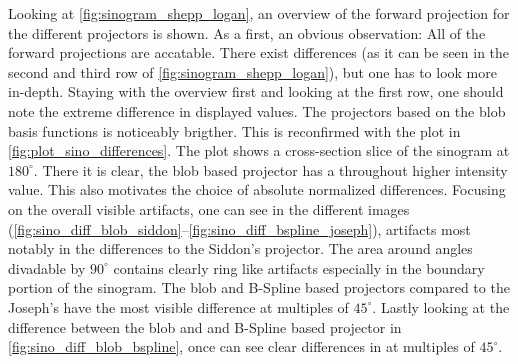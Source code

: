 Looking at \autoref{fig:sinogram_shepp_logan}, an overview of the forward projection for the
different projectors is shown. As a first, an obvious observation: All of the forward projections
are accatable. There exist differences (as it can be seen in the second and third row of
\autoref{fig:sinogram_shepp_logan}), but one has to look more in-depth. Staying with the overview
first and looking at the first row, one should note the extreme difference in displayed values. The
projectors based on the blob basis functions is noticeably brigther. This is reconfirmed with the
plot in \autoref{fig:plot_sino_differences}. The plot shows a cross-section slice of the sinogram at
\(180^\circ\). There it is clear, the blob based projector has a throughout higher intensity value.
This also motivates the choice of absolute normalized differences. Focusing on the overall visible
artifacts, one can see in the different images
(\autoref{fig:sino_diff_blob_siddon}--\autoref{fig:sino_diff_bspline_joseph}), artifacts most
notably in the differences to the Siddon's projector. The area around angles divadable by
\(90^\circ\) contains clearly ring like artifacts especially in the boundary portion of the
sinogram. The blob and B-Spline based projectors compared to the Joseph's have the most visible
difference at multiples of \(45^\circ\).
Lastly looking at the difference between the blob and and B-Spline based projector in
\autoref{fig:sino_diff_blob_bspline}, once can see clear differences in at multiples of
\(45^\circ\).

